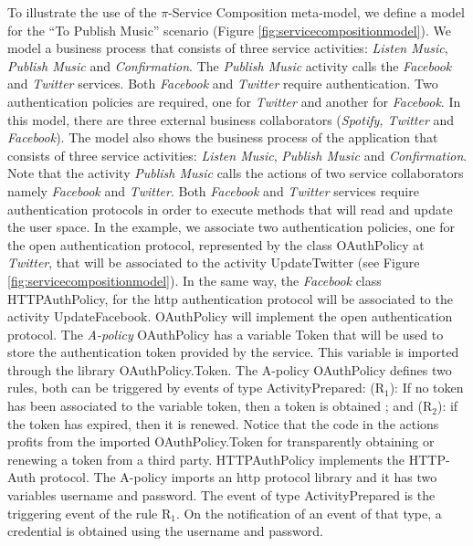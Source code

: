 \begin{example}\label{ex:toPublicMusic4}
To illustrate the use of the $\pi$-Service Composition meta-model, we define a model for the ``To Publish Music'' scenario (Figure \ref{fig:servicecompositionmodel}). 
 We model a business process that consists of three service activities: {\em Listen Music}, {\em Publish Music} and {\em Confirmation}. 
The {\em Publish Music} activity calls the {\em Facebook} and {\em Twitter} services.
Both {\em Facebook} and {\em Twitter} require authentication. 
Two authentication policies are required, one for {\em Twitter} and another for {\em Facebook}.
In this model, there are three external business collaborators ({\em Spotify, Twitter} and {\em Facebook}).
The model also shows the business process of the application that consists of three service activities: {\em Listen Music}, {\em Publish Music} and {\em Confirmation}. 
Note that  the activity {\em Publish Music} calls the actions of two service collaborators namely {\em Facebook} and {\em Twitter}.
Both {\em Facebook} and {\em Twitter} services require authentication protocols in order to execute methods that will read and update the user space. 
In the example, we  associate two authentication policies, one for the open authentication protocol, represented by the class {\sf\small OAuthPolicy} at {\em Twitter}, that will be associated to the activity  {\sf\small UpdateTwitter} (see Figure \ref{fig:servicecompositionmodel}). 
In the same way, the {\em Facebook} class {\sf\small HTTPAuthPolicy}, for the http authentication protocol will be associated to the activity {\sf\small UpdateFacebook}.
{\sf\small OAuthPolicy} will implement the open authentication protocol.
The {\em A-policy} {\sf\small OAuthPolicy} has a variable {\sf\small Token} that will be used to store the authentication token provided by the service.
This variable is imported through the library {\sf\small OAuthPolicy.Token}. 
The A-policy {\sf\small OAuthPolicy} defines two rules, both can be triggered by events of type {\sf\small ActivityPrepared}: (R$_1$): If no token has been associated to the variable {\sf\small token}, then a token is obtained ; and (R$_2$): if the token has expired, then it is renewed. 
Notice that the code in the actions profits from the imported {\sf\small OAuthPolicy.Token} for transparently obtaining or renewing a token from a third party.
{\sf\small HTTPAuthPolicy} implements the HTTP-Auth protocol. 
The A-policy imports an http protocol library and it has two variables {\sf\small username} and {\sf\small password}.  
The event of type {\sf\small ActivityPrepared} is the triggering event of the rule {\sf\small R$_1$}. 
On the notification of an event of that type, a credential is obtained using the username and password. 
\hfill\openbox
\end{example}

